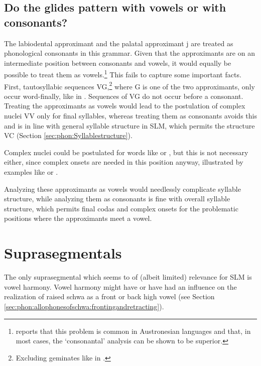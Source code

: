 \subsection{Do the glides pattern with vowels or with consonants?}\label{sec:phon:Dotheglidespatternwithvowelsorwithconsonants}
The labiodental approximant \V{} and the palatal approximant j are treated as phonological consonants in this grammar. Given that the approximants are on an intermediate position between consonants and vowels, it would equally be possible to treat them as vowels.\footnote{\citet[116]{Himmelmann2005typochar} reports that this problem is common in Austronesian languages and that, in most cases, the `consonantal' analysis can be shown to be superior.} This fails to capture some important facts. First, tautosyllabic sequences VG,\footnote{Excluding geminates like in .} where G is one of the two approximants, only occur word-finally, like in . Sequences of VG do not occur before a consonant.  Treating the approximants as vowels would lead to the postulation of complex nuclei VV only for final syllables, whereas treating them as consonants avoids this and is in line with general syllable structure in SLM, which permits the structure VC (Section \ref{sec:phon:Syllablestructure}).

Complex nuclei could be postulated for words like  or , but this is not necessary either, since complex onsets are needed in this position anyway, illustrated by examples like  or .

Analyzing these approximants as vowels would needlessly complicate syllable structure, while analyzing them as consonants is fine with overall syllable structure, which permits final codas and complex onsets for the problematic positions where the approximants meet a vowel.%



\section{Suprasegmentals}\label{sec:phon:Suprasegmentals}
The only suprasegmental which seems to of (albeit limited) relevance for SLM is vowel harmony. Vowel harmony might have or have had an influence on the realization  of raised schwa as a front or back high vowel (see Section \ref{sec:phon:allophonesofschwa:frontingandretracting}).

